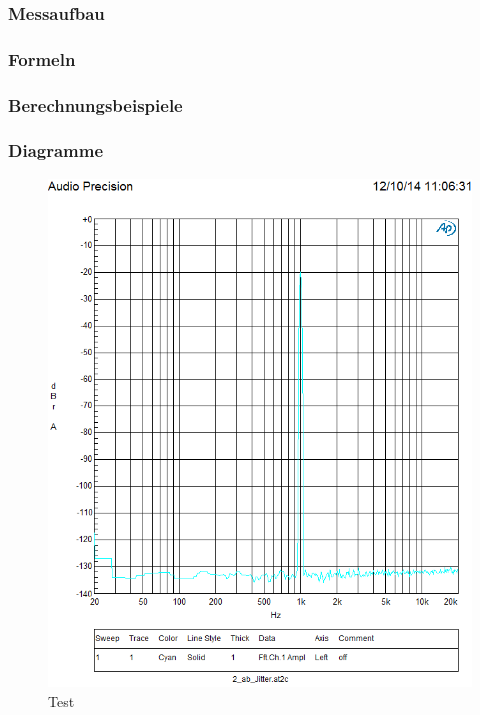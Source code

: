 \subsubsection{Messaufbau}

\subsubsection{Formeln}

\subsubsection{Berechnungsbeispiele}

\subsubsection{Diagramme}

\begin{figure}[h!]
\centering
\includegraphics[width=\columnwidth]{figures/Aufg2/off_1khz.PNG} 
\caption{Test}
\end{figure}


